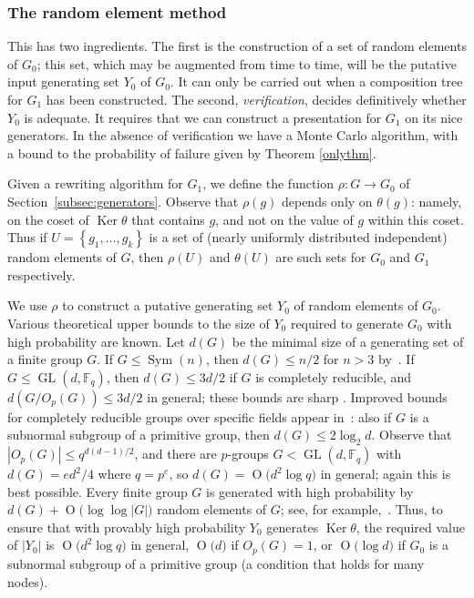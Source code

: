 \documentclass[12pt,twoside,reqno,psamsfonts]{amsproc}
\numberwithin{equation}{section}
\numberwithin{figure}{section}
\newcounter{algorithm}
\theoremstyle{plain}
\theoremstyle{definition}
\theoremstyle{remark}
\providecommand{\abs}[1]{\left\lvert #1 \right\rvert}
\providecommand{\set}[1]{\left\lbrace #1 \right\rbrace}
\providecommand{\Sym}[1]{\operatorname{Sym}( #1 )}
\newcommand{\field}[1]{\mathbb{#1}}
\newcommand{\F}{\field{F}}
\DeclareMathOperator{\GL}{GL}
\DeclareMathOperator{\Ker}{Ker}
\newcommand{\OR}[1]{\operatorname{O} \bigl( #1 \bigr)}
\begin{document}
\subsubsection{The random element method}\label{subsubsec:randommethod}
This has two ingredients.  
The first is the construction of a set of random elements of $G_0$; this set, 
which may be augmented from time to time, will be the
putative input generating set $Y_0$ of $G_0$.  
It can only be carried out when a composition tree for $G_1$
has been constructed.
The second, {\em verification}, decides
definitively whether $Y_0$ is adequate.
It requires that we 
can construct a presentation for $G_1$ on its nice generators.
In the absence of verification we have a Monte Carlo algorithm, with
a bound to the probability of failure given by Theorem \ref{onlythm}.


\vspace*{0.1cm} 
Given a rewriting algorithm for $G_1$, we define the function
$\rho:G\to G_0$ of Section~\ref{subsec:generators}.
Observe that $\rho(g)$ depends only on $\theta(g)$: namely, on the coset of
$\Ker \theta$ that contains $g$, and not on the value of $g$ within this
coset.  Thus if $U=\set{g_1,\dotsc,g_k}$ is
a set of (nearly uniformly distributed independent) random elements 
of $G$, then $\rho(U)$ and 
$\theta(U)$ are such sets for $G_0$ and $G_1$ respectively.

We use $\rho$ to construct a putative generating 
set $Y_0$ of random elements of $G_0$.
Various theoretical upper bounds to the size of $Y_0$ required
to generate $G_0$ with high probability are known.
Let $d(G)$ be the minimal size of a generating set
of a finite group $G$.
If $G \leqslant \Sym{n}$, then $d(G) \leqslant n/2$ for $n>3$ by~\cite{CST89}.
If $G \leqslant \GL(d,\F_q)$, then $d(G) \leqslant 3d/2$ if $G$ is completely
reducible, and $d(G/O_p(G)) \leqslant 3d/2$ in general; these bounds 
are sharp \cite{KR91}. Improved bounds for completely reducible
groups over specific fields appear in~\cite{matgp_gens}: 
also if $G$ is a subnormal subgroup of a primitive group,
then $d(G) \leqslant  2 \log_2 d$. %
Observe that $|O_p(G)| \leqslant q^{d(d-1)/2}$, and there
are $p$-groups $G< \GL(d,\F_q)$ with $d(G) = ed^2/4$ where $q=p^e$, so
$d(G) = \OR{d^2\log q}$ in general; again this is best possible. 
Every finite group $G$ is generated with high probability by 
$d(G) + \OR{\log\log |G|}$ random elements of $G$; see, for example,~\cite{L02}.
Thus, to ensure that with provably high probability $Y_0$
generates $\Ker \theta$, the required value of $\abs{Y_0}$ 
is $\OR{d^2 \log q}$ in general, $\OR{d}$ if $O_p(G)=1$,
or $\OR{\log d}$ if $G_0$ is a subnormal subgroup of a primitive
group (a condition that holds for many nodes).
\end{document}
